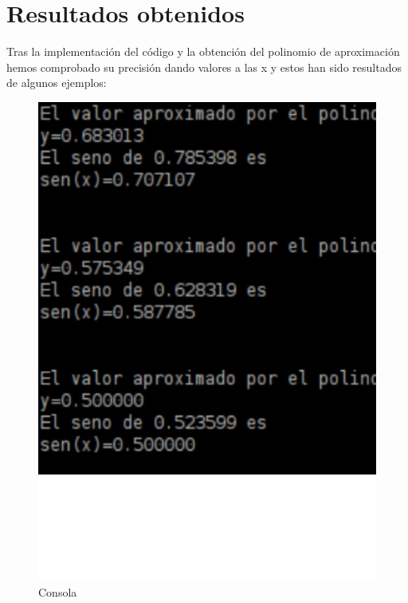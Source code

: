 \section{Resultados obtenidos}
\label{3:sec:3}
Tras la implementación del código y la obtención del polinomio de aproximación hemos comprobado su precisión dando valores a las x y estos han sido resultados de algunos ejemplos:
\vspace{1.5 true cm}


\begin{figure}[!h]
\includegraphics[scale=0.38]{images/comprobacion.eps}
\caption{Consola}
\label{graph:2}
\end{figure}
